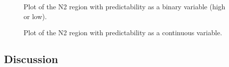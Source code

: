 \documentclass[
  12pt,
  letterpaper,
]{scrreport}
\begin{document}
\begin{figure}[htbp]

\caption{\label{fig-N2Predictability}Plot of the N2 region with
predictability as a binary variable (high or low).}


\end{figure}%

\begin{figure}[htbp]

\caption{\label{fig-N2LogOdds}Plot of the N2 region with predictability
as a continuous variable.}


\end{figure}%

\subsection{Discussion}\label{discussion-1}
\end{document}
